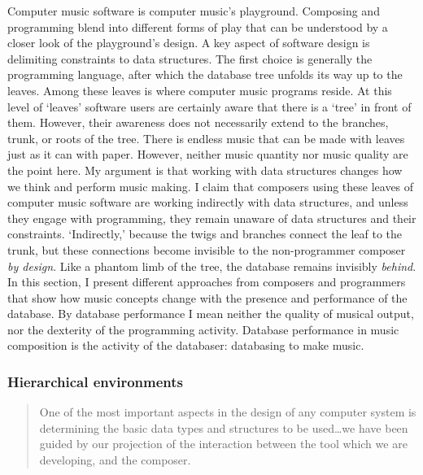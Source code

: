 Computer music software is computer music's playground. Composing and programming blend into different forms of play that can be understood by a closer look of the playground's design. A key aspect of software design is delimiting constraints to data structures. The first choice is generally the programming language, after which the database tree unfolds its way up to the leaves. Among these leaves is where computer music programs reside. At this level of `leaves' software users are certainly aware that there is a `tree' in front of them. However, their awareness does not necessarily extend to the branches, trunk, or roots of the tree. There is endless music that can be made with leaves just as it can with paper. However, neither music quantity nor music quality are the point here. My argument is that working with data structures changes how we think and perform music making. I claim that composers using these leaves of computer music software are working indirectly with data structures, and unless they engage with programming, they remain unaware of data structures and their constraints. `Indirectly,' because the twigs and branches connect the leaf to the trunk, but these connections become invisible to the non-programmer composer \textit{by design}. Like a phantom limb of the tree, the database remains invisibly \textit{behind}. In this section, I present different approaches from composers and programmers that show how music concepts change with the presence and performance of the database. By database performance I mean neither the quality of musical output, nor the dexterity of the programming activity. Database performance in music composition is the activity of the databaser: databasing to make music.


\subsubsection{Hierarchical environments}
\label{computer:sssp}

	\begin{quote}
		One of the most important aspects in the design of any computer system is determining the basic data types and structures to be used\dots we have been guided by our projection of the interaction between the tool which we are developing, and the composer. \parencite[119]{icmc/bbp2372.1978.012}
	\end{quote}

